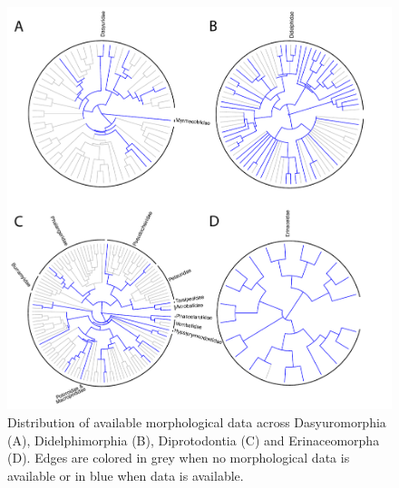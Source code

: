 \begin{figure}[!ht]
\centering
    \includegraphics[width=\textwidth]{Supplementaries/Figures/MissingMammals/Combined_phy2.pdf}
\caption[Available data in Dasyuromorphia, Didelphimorphia, Diprotodontia and Erinaceomorpha]{Distribution of available morphological data across Dasyuromorphia (A), Didelphimorphia (B), Diprotodontia (C) and Erinaceomorpha (D). Edges are colored in grey when no morphological data is available or in blue when data is available.}
\label{Supp_combined_phy2}
\end{figure}

